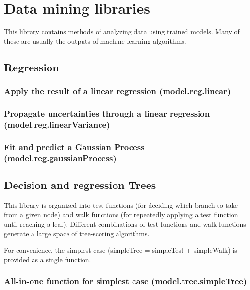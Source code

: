 \documentclass{article}
\theoremstyle{definition}
\begin{document}
\pagebreak

\section{Data mining libraries}

This library contains methods of analyzing data using trained models.  Many of these are usually the outputs of machine learning algorithms.

\subsection{Regression}

\subsubsection{Apply the result of a linear regression (model.reg.linear)}

\subsubsection{Propagate uncertainties through a linear regression (model.reg.linearVariance)}

\subsubsection{Fit and predict a Gaussian Process (model.reg.gaussianProcess)}

\subsection{Decision and regression Trees}

This library is organized into test functions (for deciding which branch to take from a given node) and walk functions (for repeatedly applying a test function until reaching a leaf). Different combinations of test functions and walk functions generate a large space of tree-scoring algorithms.

For convenience, the simplest case (simpleTree = simpleTest + simpleWalk) is provided as a single function.

\subsubsection{All-in-one function for simplest case (model.tree.simpleTree)}
\end{document}
